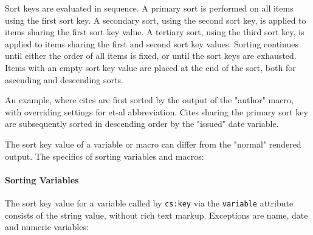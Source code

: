 Sort keys are evaluated in sequence. A primary sort is performed on all
items using the first sort key. A secondary sort, using the second sort
key, is applied to items sharing the first sort key value. A tertiary
sort, using the third sort key, is applied to items sharing the first
and second sort key values. Sorting continues until either the order of
all items is fixed, or until the sort keys are exhausted. Items with an
empty sort key value are placed at the end of the sort, both for
ascending and descending sorts.

An example, where cites are first sorted by the output of the "author"
macro, with overriding settings for et-al abbreviation. Cites sharing
the primary sort key are subsequently sorted in descending order by the
"issued" date variable.

\begin{Shaded}
\begin{Highlighting}[]
\NormalTok{\textless{}}\NormalTok{\textgreater{}}
\NormalTok{  \textless{}}\NormalTok{\textgreater{}}
\NormalTok{    \textless{}}\NormalTok{/\textgreater{}}
\NormalTok{    \textless{}}\NormalTok{/\textgreater{}}
\NormalTok{  \textless{}/}\NormalTok{\textgreater{}}
\NormalTok{  \textless{}}\NormalTok{\textgreater{}}
\NormalTok{  \textless{}/}\NormalTok{\textgreater{}}
\NormalTok{\textless{}/}\NormalTok{\textgreater{}}
\end{Highlighting}
\end{Shaded}

The sort key value of a variable or macro can differ from the "normal"
rendered output. The specifics of sorting variables and macros:

\hypertarget{sorting-variables}{%
\paragraph{Sorting Variables}\label{sorting-variables}}

The sort key value for a variable called by \texttt{cs:key} via the
\texttt{variable} attribute consists of the string value, without rich
text markup. Exceptions are name, date and numeric variables:

